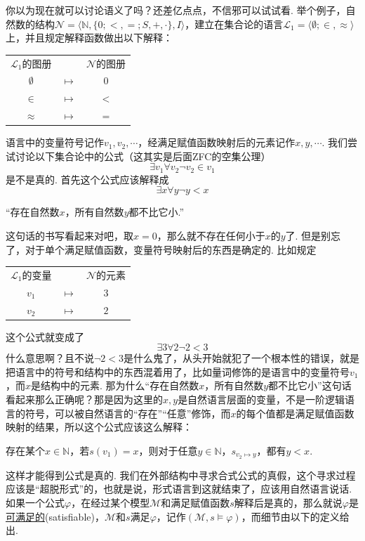 \documentclass[main.tex]{subfiles}
\begin{document}
你以为现在就可以讨论语义了吗？还差亿点点，不信邪可以试试看. 举个例子，自然数的结构\(\mathcal{N} = \langle \mathbb{N}, \{0; <, =; S,+,\cdot\}, I \rangle\)，建立在集合论的语言\(\mathcal{L}_1 = \langle \emptyset; \in, \approx \rangle\)上，并且规定解释函数做出以下解释：
\begin{center}
    \begin{tabular}{ccc}
        \(\mathcal{L}_1\)的图册 & & \(\mathcal{N}\)的图册 \\
        \(\emptyset\) & \(\longmapsto\) & \(0\) \\
        \(\in\) & \(\longmapsto\) & \(<\) \\
        \(\approx\) & \(\longmapsto\) & \(=\)
    \end{tabular}
\end{center}
语言中的变量符号记作\(v_1, v_2, \cdots\)，经满足赋值函数映射后的元素记作\(x,y,\cdots\). 我们尝试讨论以下集合论中的公式（这其实是后面\textsf{ZFC}的空集公理）
\[\exists v_1 \forall v_2 \neg v_2 \in v_1\]
是不是真的. 首先这个公式应该解释成
\[\exists x \forall y \neg y < x\]
\begin{center}
    “存在自然数\(x\)，所有自然数\(y\)都不比它小.”
\end{center}
这句话的书写看起来对吧，取\(x=0\)，那么就不存在任何小于\(x\)的\(y\)了. 但是别忘了，对于单个满足赋值函数，变量符号映射后的东西是确定的. 比如规定
\begin{center}
    \begin{tabular}{ccc}
        \(\mathcal{L}_1\)的变量 & & \(\mathcal{N}\)的元素 \\
        \(v_1\) & \(\longmapsto\) & \(3\) \\
        \(v_2\) & \(\longmapsto\) & \(2\)
    \end{tabular}
\end{center}
这个公式就变成了
\[\exists 3 \forall 2 \neg 2 < 3\]
什么意思啊？且不说\(\neg 2<3\)是什么鬼了，从头开始就犯了一个根本性的错误，就是把语言中的符号和结构中的东西混着用了，比如量词修饰的是语言中的变量符号\(v_1\)，而\(x\)是结构中的元素. 那为什么“存在自然数\(x\)，所有自然数\(y\)都不比它小”这句话看起来那么正确呢？那是因为这里的\(x,y\)是自然语言层面的变量，不是一阶逻辑语言的符号，可以被自然语言的“存在”“任意”修饰，而\(x\)的每个值都是满足赋值函数映射的结果，所以这个公式应该这么解释：
\begin{center}
    存在某个\(x \in \mathbb{N}\)，若\(s(v_1) = x\)，则对于任意\(y \in \mathbb{N}\)，\(s_{v_2 \mapsto y}\)，都有\(y<x\).
\end{center}
这样才能得到公式是真的. 我们在外部结构中寻求合式公式的真假，这个寻求过程应该是“超脱形式”的，也就是说，形式语言到这就结束了，应该用自然语言说话. 如果一个公式\(\varphi\)，在经过某个模型\(\mathcal{M}\)和满足赋值函数\(s\)解释后是真的，那么就说\(\varphi\)是\uline{可满足的}(satisfiable)，\(\mathcal{M}\)和\(s\)满足\(\varphi\)，记作\((\mathcal{M}, s \vDash \varphi)\)，而细节由以下的定义给出.
\end{document}
